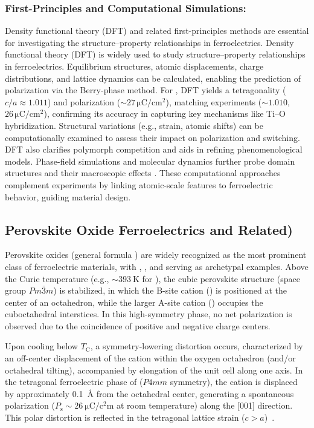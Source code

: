 \documentclass[a4paper,fleqn]{cas-sc}
\begin{document}
\subsubsection*{First-Principles and Computational Simulations: }
\par Density functional theory (DFT) and related first-principles methods are essential for investigating the structure–property relationships in ferroelectrics. Density functional theory (DFT) is widely used to study structure--property relationships in ferroelectrics. Equilibrium structures, atomic displacements, charge distributions, and lattice dynamics can be calculated, enabling the prediction of polarization via the Berry-phase method. For , DFT yields a tetragonality ($c/a \approx 1.011$) and polarization ($\sim\!27\,\mathrm{\mu C/cm^2}$), matching experiments ($\sim\!1.010$, $26\,\mathrm{\mu C/cm^2}$), confirming its accuracy in capturing key mechanisms like Ti--O hybridization. Structural variations (e.g., strain, atomic shifts) can be computationally examined to assess their impact on polarization and switching. DFT also clarifies polymorph competition and aids in refining phenomenological models. Phase-field simulations and molecular dynamics further probe domain structures and their macroscopic effects \cite{aslla2021role}. These computational approaches complement experiments by linking atomic-scale features to ferroelectric behavior, guiding material design.

\subsection*{Perovskite Oxide Ferroelectrics  and Related)}
\par Perovskite oxides (general formula ) are widely recognized as the most prominent class of ferroelectric materials, with , , and  serving as archetypal examples. Above the Curie temperature (e.g., $\sim\SI{393}{\kelvin}$ for ), the cubic perovskite structure (space group $Pm\bar{3}m$) is stabilized, in which the B-site cation () is positioned at the center of an  octahedron, while the larger A-site cation () occupies the cuboctahedral interstices. In this high-symmetry phase, no net polarization is observed due to the coincidence of positive and negative charge centers.

Upon cooling below $T_{\mathrm{C}}$, a symmetry-lowering distortion occurs, characterized by an off-center displacement of the  cation within the oxygen octahedron (and/or octahedral tilting), accompanied by elongation of the unit cell along one axis. In the tetragonal ferroelectric phase of  ($P4mm$ symmetry), the  cation is displaced by approximately \SI{0.1}{\angstrom} from the octahedral center, generating a spontaneous polarization ($P_{\mathrm{s}} \sim \SI{26}{\micro\coulomb\per\square\centi\meter}$ at room temperature) along the [001] direction. This polar distortion is reflected in the tetragonal lattice strain ($c > a$)~\cite{aslla2021role}.
\end{document}
